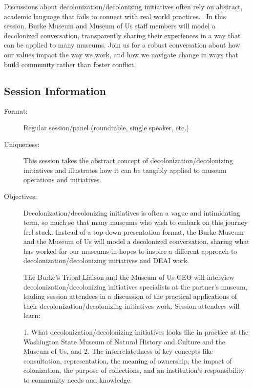 \documentclass{report}
\begin{document}
              Discussions about decolonization/decolonizing initiatives often rely on abstract, academic language that fails to connect with real world practices. 
In this session, Burke Museum and Museum of Us staff members will model a decolonized conversation, transparently sharing their experiences in a way that can be applied to many museums.
Join us for a robust conversation about how our values impact the way we work, and how we navigate change in ways that build community rather than foster conflict.

              \subsection*{Session Information}
                \begin{description}
                  \item [Format:] Regular session/panel (roundtable, single speaker, etc.)
							    
							    \item [Uniqueness:]This session takes the abstract concept of decolonization/decolonizing initiatives and illustrates how it can be tangibly applied to museum operations and initiatives.
							    \item [Objectives:]Decolonization/decolonizing initiatives is often a vague and intimidating term, so much so that many museums who wish to embark on this journey feel stuck. Instead of a top-down presentation format, the Burke Museum and the Museum of Us will model a decolonized conversation, sharing what has worked for our museums in hopes to inspire a different approach to decolonization/decolonizing initiatives and DEAI work.  

The Burke’s Tribal Liaison and the Museum of Us CEO will interview decolonization/decolonizing initiatives specialists at the partner’s museum, leading session attendees in a discussion of the practical applications of their decolonization/decolonizing initiatives work. Session attendees will learn:

1. What decolonization/decolonizing initiatives looks like in practice at the Washington State Museum of Natural History and Culture and the Museum of Us, and
2. The interrelatedness of key concepts like consultation, representation, the meaning of ownership, the impact of colonization, the purpose of collections, and an institution’s responsibility to community needs and knowledge.


\end{description}
\end{document}
